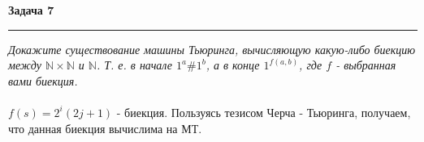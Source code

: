 \documentclass[a4paper,11pt]{article}
\begin{document}




\textbf{\large Задача 7}
\medskip\hrule\medskip
\textit{Докажите существование машины Тьюринга, вычисляющую какую-либо биекцию между $ \mathbb{N} \times \mathbb{N} $ и $ \mathbb{N} $. Т. е. в начале $ 1^a\#1^b $, а в конце $ 1^{f(a, b)} $, где $ f $ - выбранная вами биекция.} \\ \\

$ f(s) = 2^i(2j + 1) $ - биекция. Пользуясь тезисом Черча - Тьюринга, получаем, что данная биекция вычислима на МТ.
\end{document}
